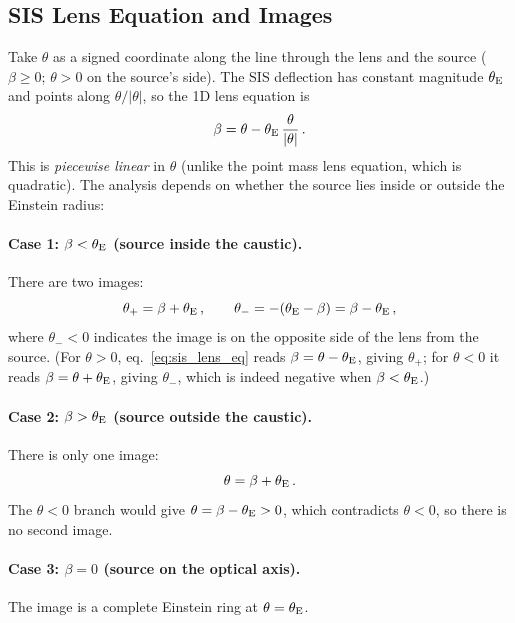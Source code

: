 \subsection{SIS Lens Equation and Images}

Take $\theta$ as a signed coordinate along the line through the lens
and the source ($\beta \geq 0$; $\theta > 0$ on the source's side).  The
SIS deflection has constant magnitude $\theta_{\mathrm{E}}$ and points along
$\theta/|\theta|$, so the 1D lens equation is
\begin{equation}
    \beta = \theta - \theta_{\mathrm{E}}\,\frac{\theta}{|\theta|} \,.
    \label{eq:sis_lens_eq}
\end{equation}
This is \textit{piecewise linear} in $\theta$ (unlike the point mass lens
equation, which is quadratic).  The analysis depends on whether the
source lies inside or outside the Einstein radius:

\paragraph{Case 1: $\beta < \theta_{\mathrm{E}}$ (source inside the caustic).}
There are two images:
\begin{equation}
    \theta_+ = \beta + \theta_{\mathrm{E}} \,, \qquad
    \theta_- = -(\theta_{\mathrm{E}} - \beta) = \beta - \theta_{\mathrm{E}} \,,
    \label{eq:sis_two_images}
\end{equation}
where $\theta_- < 0$ indicates the image is on the opposite side of
the lens from the source.  (For $\theta > 0$,
eq.~\eqref{eq:sis_lens_eq} reads $\beta = \theta - \theta_{\mathrm{E}}$, giving
$\theta_+$; for $\theta < 0$ it reads $\beta = \theta + \theta_{\mathrm{E}}$,
giving $\theta_-$, which is indeed negative when $\beta < \theta_{\mathrm{E}}$.)

\paragraph{Case 2: $\beta > \theta_{\mathrm{E}}$ (source outside the caustic).}
There is only one image:
\begin{equation}
    \theta = \beta + \theta_{\mathrm{E}} \,.
    \label{eq:sis_one_image}
\end{equation}
The $\theta < 0$ branch would give $\theta = \beta - \theta_{\mathrm{E}} > 0$,
which contradicts $\theta < 0$, so there is no second image.

\paragraph{Case 3: $\beta = 0$ (source on the optical axis).}
The image is a complete Einstein ring at $\theta = \theta_{\mathrm{E}}$.

